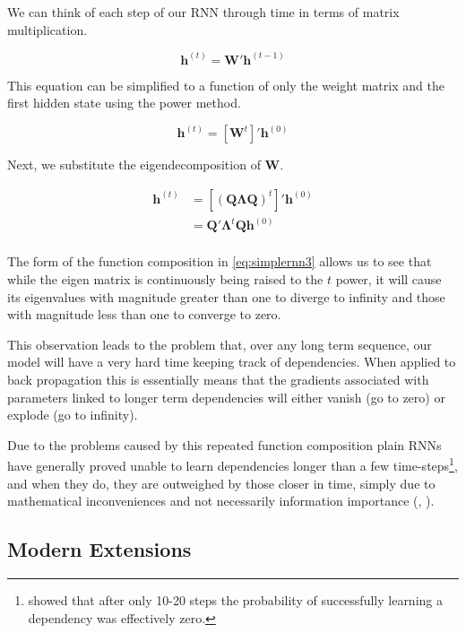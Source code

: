 \documentclass[]{book}
\let\rmarkdownfootnote\footnote%
\def\footnote{\protect\rmarkdownfootnote}
\theoremstyle{definition}
\theoremstyle{definition}
\theoremstyle{definition}
\theoremstyle{remark}
\begin{document}
We can think of each step of our RNN through time in terms of matrix
multiplication.

\begin{equation} 
  \mathbf{h}^{(t)} = \mathbf{W}' \mathbf{h}^{(t - 1)}
  \label{eq:simplernn1}
\end{equation}

This equation can be simplified to a function of only the weight matrix
and the first hidden state using the power method.

\begin{equation} 
  \mathbf{h}^{(t)} = \left[\mathbf{W}^t\right]' \mathbf{h}^{(0)}
  \label{eq:simplernn2}
\end{equation}

Next, we substitute the eigendecomposition of \(\mathbf{W}\).

\begin{align} 
  \mathbf{h}^{(t)} &= \left[(\mathbf{Q}\mathbf{\Lambda}\mathbf{Q})^t\right]' \mathbf{h}^{(0)} \\
                    &= \mathbf{Q}'\mathbf{\Lambda}^t \mathbf{Q} \mathbf{h}^{(0)} \\
  \label{eq:simplernn3}
\end{align}

The form of the function composition in \eqref{eq:simplernn3} allows us to
see that while the eigen matrix is continuously being raised to the
\(t\) power, it will cause its eigenvalues with magnitude greater than
one to diverge to infinity and those with magnitude less than one to
converge to zero.

This observation leads to the problem that, over any long term sequence,
our model will have a very hard time keeping track of dependencies. When
applied to back propagation this is essentially means that the gradients
associated with parameters linked to longer term dependencies will
either vanish (go to zero) or explode (go to infinity).

Due to the problems caused by this repeated function composition plain
RNNs have generally proved unable to learn dependencies longer than a
few time-steps\footnote{\citet{bengio_gradient} showed that after only
  10-20 steps the probability of successfully learning a dependency was
  effectively zero.}, and when they do, they are outweighed by those
closer in time, simply due to mathematical inconveniences and not
necessarily information importance (\citet{bengio_gradient},
\citet{graves_rnn}).

\subsection{Modern Extensions}\label{modern-extensions}
\end{document}
